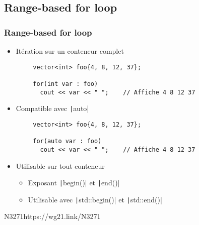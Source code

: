 \documentclass[C++.tex]{subfiles}
\begin{document}
\subsection*{Range-based for loop}
\begin{frame}[fragile]
	\frametitle{Range-based for loop}
	\begin{itemize}
		\item Itération sur un conteneur complet
	\end{itemize}

	\begin{verbatim}
		vector<int> foo{4, 8, 12, 37};

		for(int var : foo)
		  cout << var << " ";    // Affiche 4 8 12 37
	\end{verbatim}

	\begin{itemize}
		\item Compatible avec \texttt|auto|
	\end{itemize}

	\begin{verbatim}
		vector<int> foo{4, 8, 12, 37};

		for(auto var : foo)
		  cout << var << " ";    // Affiche 4 8 12 37
	\end{verbatim}

	\begin{itemize}
		\item Utilisable sur tout conteneur
		\begin{itemize}
			\item Exposant \texttt|begin()| et \texttt|end()|
			\item Utilisable avec \texttt|std::begin()| et \texttt|std::end()|
		\end{itemize}
	\end{itemize}

		{N3271}{https://wg21.link/N3271}
\end{frame}
\end{document}
